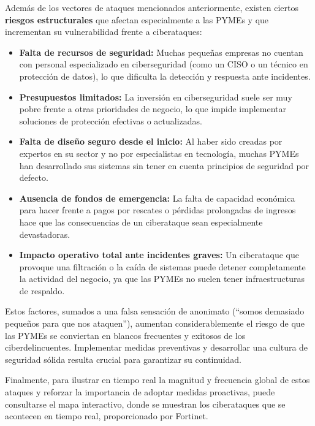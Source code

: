 \documentclass[a4paper, 10pt]{article}
\begin{document}
\par\vspace{0.5cm}
Además de los vectores de ataques mencionados anteriormente, existen ciertos \textbf{riesgos estructurales} que afectan especialmente a las PYMEs y que incrementan su vulnerabilidad frente a ciberataques:

\begin{itemize}
  \item \textbf{Falta de recursos de seguridad:} Muchas pequeñas empresas no cuentan con personal especializado en ciberseguridad (como un CISO o un técnico en protección de datos), lo que dificulta la detección y respuesta ante incidentes.
  \item \textbf{Presupuestos limitados:} La inversión en ciberseguridad suele ser muy pobre frente a otras prioridades de negocio, lo que impide implementar soluciones de protección efectivas o actualizadas.
  \item \textbf{Falta de diseño seguro desde el inicio:} Al haber sido creadas por expertos en su sector y no por especialistas en tecnología, muchas PYMEs han desarrollado sus sistemas sin tener en cuenta principios de seguridad por defecto.
  \item \textbf{Ausencia de fondos de emergencia:} La falta de capacidad económica para hacer frente a pagos por rescates o pérdidas prolongadas de ingresos hace que las consecuencias de un ciberataque sean especialmente devastadoras.
  \item \textbf{Impacto operativo total ante incidentes graves:} Un ciberataque que provoque una filtración o la caída de sistemas puede detener completamente la actividad del negocio, ya que las PYMEs no suelen tener infraestructuras de respaldo.
\end{itemize}

\par\vspace{0.5cm}
Estos factores, sumados a una falsa sensación de anonimato (“somos demasiado pequeños para que nos ataquen”), aumentan considerablemente el riesgo de que las PYMEs se conviertan en blancos frecuentes y exitosos de los ciberdelincuentes. 
Implementar medidas preventivas y desarrollar una cultura de seguridad sólida resulta crucial para garantizar su continuidad.\cite{toms2021}
\par\vspace{0.5cm}

Finalmente, para ilustrar en tiempo real la magnitud y frecuencia global de estos ataques y reforzar la importancia de adoptar medidas proactivas, puede consultarse el mapa 
interactivo, donde se muestran los ciberataques que se acontecen en tiempo real, proporcionado por Fortinet. 
\end{document}

